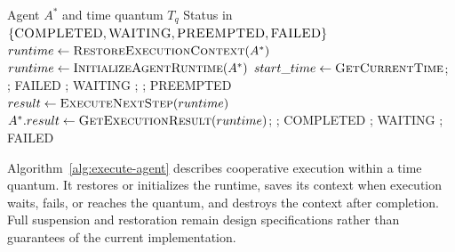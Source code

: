 \begin{algorithm}[H]
\caption{Cooperative Time-Sliced Agent Execution}
\label{alg:execute-agent}
\begin{algorithmic}[1]
\Require Agent $A^*$ and time quantum $T_q$
\Ensure Status in $\{\textsc{COMPLETED},\textsc{WAITING},\textsc{PREEMPTED},\textsc{FAILED}\}$
        \State $runtime \gets \Call{RestoreExecutionContext}{A^*}$
    \Else
        \State $runtime \gets \Call{InitializeAgentRuntime}{A^*}$
    \EndIf
    \State $start\_time \gets \Call{GetCurrentTime}{}$; 
            \State {}; \Return \textsc{FAILED}
        \EndIf
            \State {}; \Return \textsc{WAITING}
        \EndIf
            \State {}; ; \Return \textsc{PREEMPTED}
        \EndIf
        \State $result \gets \Call{ExecuteNextStep}{runtime}$
            \State $A^*.result \gets \Call{GetExecutionResult}{runtime}$; ; \Return \textsc{COMPLETED}
            \State {}; \Return \textsc{WAITING}
            \State {}; \Return \textsc{FAILED}
        \EndIf
    \EndWhile
\EndProcedure
\end{algorithmic}
\end{algorithm}
Algorithm~\ref{alg:execute-agent} describes cooperative execution within a time quantum. It restores or initializes the runtime, saves its context when execution waits, fails, or reaches the quantum, and destroys the context after completion. Full suspension and restoration remain design specifications rather than guarantees of the current implementation.

